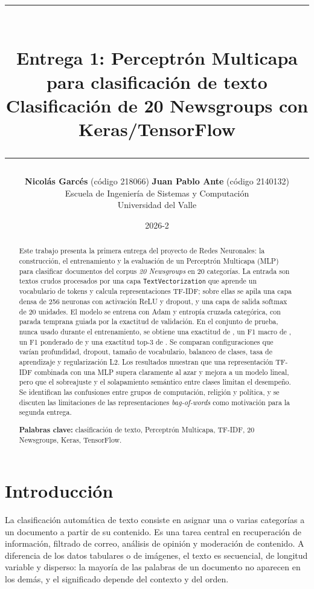 \documentclass[11pt,letterpaper]{article}
\title{
  \vspace{-1.2cm}
  {\color{uvblue}\rule{\textwidth}{1.2pt}}\\[0.5cm]
  \textbf{Entrega 1: Perceptrón Multicapa para clasificación de texto}\\[0.25cm]
  \large Clasificación de 20 Newsgroups con Keras/TensorFlow\\[0.4cm]
  {\color{uvblue}\rule{\textwidth}{1.2pt}}
}
\author{
  \textbf{Nicolás Garcés} (código 218066) \quad \textbf{Juan Pablo Ante} (código 2140132)\\[0.15cm]
  \small Escuela de Ingeniería de Sistemas y Computación\\
  \small Universidad del Valle
}
\date{2026-2}
\begin{document}
\maketitle

\vspace{-0.6cm}
\begin{abstract}
\noindent
Este trabajo presenta la primera entrega del proyecto de Redes Neuronales: la construcción, el entrenamiento y la evaluación de un Perceptrón Multicapa (MLP) para clasificar documentos del corpus \textit{20 Newsgroups} en 20 categorías. La entrada son textos crudos procesados por una capa \texttt{TextVectorization} que aprende un vocabulario de \Vocab{} tokens y calcula representaciones TF-IDF; sobre ellas se apila una capa densa de 256 neuronas con activación ReLU y dropout, y una capa de salida softmax de 20 unidades. El modelo se entrena con Adam y entropía cruzada categórica, con parada temprana guiada por la exactitud de validación. En el conjunto de prueba, nunca usado durante el entrenamiento, se obtiene una exactitud de \Accuracy{}, un F1 macro de \MacroF{}, un F1 ponderado de \WeightedF{} y una exactitud top-3 de \TopThree{}. Se comparan \NumExperiments{} configuraciones que varían profundidad, dropout, tamaño de vocabulario, balanceo de clases, tasa de aprendizaje y regularización L2. Los resultados muestran que una representación TF-IDF combinada con una MLP supera claramente al azar y mejora a un modelo lineal, pero que el sobreajuste y el solapamiento semántico entre clases limitan el desempeño. Se identifican las confusiones entre grupos de computación, religión y política, y se discuten las limitaciones de las representaciones \textit{bag-of-words} como motivación para la segunda entrega.

\vspace{0.2cm}
\noindent\textbf{Palabras clave:} clasificación de texto, Perceptrón Multicapa, TF-IDF, 20 Newsgroups, Keras, TensorFlow.
\end{abstract}

\tableofcontents
\newpage

\section{Introducción}

La clasificación automática de texto consiste en asignar una o varias categorías a un documento a partir de su contenido. Es una tarea central en recuperación de información, filtrado de correo, análisis de opinión y moderación de contenido. A diferencia de los datos tabulares o de imágenes, el texto es secuencial, de longitud variable y disperso: la mayoría de las palabras de un documento no aparecen en los demás, y el significado depende del contexto y del orden.
\end{document}
